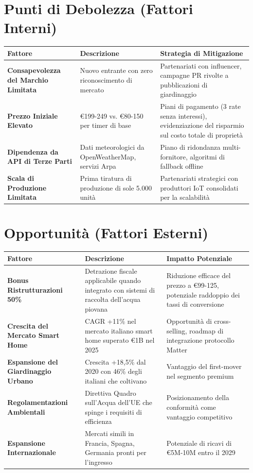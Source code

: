 \documentclass[11pt,a4paper]{report}
\begin{document}
\section{Punti di Debolezza (Fattori Interni)}

\begin{longtable}{|p{3cm}|p{4.5cm}|p{3cm}|}
\hline
\textbf{Fattore} & \textbf{Descrizione} & \textbf{Strategia di Mitigazione} \\ \hline
\textbf{Consapevolezza del Marchio Limitata} & Nuovo entrante con zero riconoscimento di mercato & Partenariati con influencer, campagne PR rivolte a pubblicazioni di giardinaggio \\ \hline
\textbf{Prezzo Iniziale Elevato} & €199-249 vs. €80-150 per timer di base & Piani di pagamento (3 rate senza interessi), evidenziazione del risparmio sul costo totale di proprietà \\ \hline
\textbf{Dipendenza da API di Terze Parti} & Dati meteorologici da OpenWeatherMap, servizi Arpa & Piano di ridondanza multi-fornitore, algoritmi di fallback offline \\ \hline
\textbf{Scala di Produzione Limitata} & Prima tiratura di produzione di sole 5.000 unità & Partenariati strategici con produttori IoT consolidati per la scalabilità \\ \hline
\end{longtable}

\section{Opportunità (Fattori Esterni)}

\begin{longtable}{|p{3cm}|p{4.5cm}|p{3cm}|}
\hline
\textbf{Fattore} & \textbf{Descrizione} & \textbf{Impatto Potenziale} \\ \hline
\textbf{Bonus Ristrutturazioni 50\%} & Detrazione fiscale applicabile quando integrato con sistemi di raccolta dell'acqua piovana & Riduzione efficace del prezzo a €99-125, potenziale raddoppio dei tassi di conversione \\ \hline
\textbf{Crescita del Mercato Smart Home} & CAGR +11\% nel mercato italiano smart home superato €1B nel 2025 & Opportunità di cross-selling, roadmap di integrazione protocollo Matter \\ \hline
\textbf{Espansione del Giardinaggio Urbano} & Crescita +18,5\% dal 2020 con 46\% degli italiani che coltivano & Vantaggio del first-mover nel segmento premium \\ \hline
\textbf{Regolamentazioni Ambientali} & Direttiva Quadro sull'Acqua dell'UE che spinge i requisiti di efficienza & Posizionamento della conformità come vantaggio competitivo \\ \hline
\textbf{Espansione Internazionale} & Mercati simili in Francia, Spagna, Germania pronti per l'ingresso & Potenziale di ricavi di €5M-10M entro il 2029 \\ \hline
\end{longtable}
\end{document}
